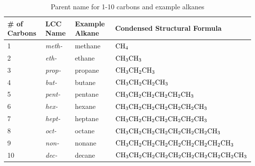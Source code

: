 \begin{table}[!ht]
    \footnotesize
    \centering
    \caption{Parent name for 1-10 carbons and example alkanes}
    \setlength{\tabcolsep}{12pt}      %
    \renewcommand{\arraystretch}{1.2} %
    \begin{tabular}{l l l l}
        \rowcolor{HeaderColor}
        \# of Carbons & LCC Name & Example Alkane & Condensed Structural Formula \\ \hline
        1 & \textit{meth-} & methane & $\ch{CH4}$ \\
        2 & \textit{eth-} & ethane & $\ch{CH3CH3}$ \\
        3 & \textit{prop-} & propane & $\ch{CH3CH2CH3}$ \\
        4 & \textit{but-} & butane & $\ch{CH3CH2CH2CH3}$ \\
        5 & \textit{pent-} & pentane & $\ch{CH3CH2CH2CH2CH2CH3}$ \\ 
        6 & \textit{hex-} & hexane & $\ch{CH3CH2CH2CH2CH2CH2CH3}$ \\
        7 & \textit{hept-} & heptane & $\ch{CH3CH2CH2CH2CH2CH2CH3}$ \\
        8 & \textit{oct-} & octane & $\ch{CH3CH2CH2CH2CH2CH2CH2CH3}$ \\
        9 & \textit{non-} & nonane & $\ch{CH3CH2CH2CH2CH2CH2CH2CH2CH3}$ \\
        10 & \textit{dec-} & decane & $\ch{CH3CH2CH2CH2CH2CH2CH2CH2CH2CH3}$ \\
    \end{tabular}
\end{table}
